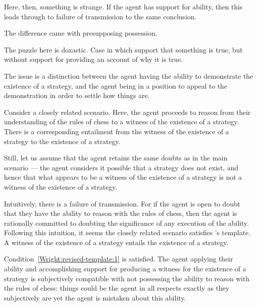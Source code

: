 \documentclass[10pt]{article}
\newcommand{\hozlinedash}[0]{%
  \noindent\hdashrule[0.5ex][c]{\textwidth}{.1pt}{2.5pt}
}
\begin{document}
\begin{note}
  Here, then, something is strange.
  If the agent has support for ability, then this leads through to failure of transmission to the same conclusion.

  The difference came with presupposing possession.

  The puzzle here is doxastic.
  Case in which support that something is true, but without support for providing an account of why it is true.
\end{note}

\hozlinedash

\begin{note}
  The issue is a distinction between the agent having the ability to demonstrate the existence of a strategy, and the agent being in a position to appeal to the demonstration in order to settle how things are.

  Consider a closely related scenario.
  Here, the agent proceeds to reason from their understanding of the rules of chess to a witness of the existence of a strategy.
  There is a corresponding entailment from the witness of the existence of a strategy to the existence of a strategy.

  Still, let us assume that the agent retains the same doubts as in the main scenario --- the agent considers it possible that a strategy does not exist, and hence that what appears to be a witness of the existence of a strategy is not a witness of the existence of a strategy.

  Intuitively, there is a failure of transmission.
  For if the agent is open to doubt that they have the ability to reason with the rules of chess, then the agent is rationally committed to doubting the significance of any execution of the ability.
  Following this intuition, it seems the closely related scenario satisfies \citeauthor{Wright:2011wn}'s template.
  A witness of the existence of a strategy entails the existence of a strategy.

  Condition~\ref{Wright:revised-template:1} is satisfied.
  The agent applying their ability and accomplishing support for producing a witness for the existence of a strategy is subjectively compatible with not possessing the ability to reason with the rules of chess: things could be the agent in all respects exactly as they subjectively are yet the agent is mistaken about this ability.


\end{note}
\end{document}
